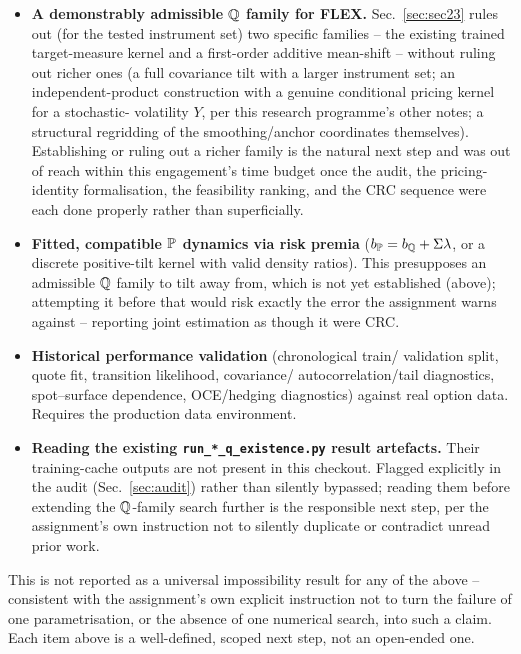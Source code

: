 \begin{itemize}[leftmargin=1.4em]
\item \textbf{A demonstrably admissible $\mathbb Q$ family for FLEX.}
  Sec.~\ref{sec:sec23} rules out (for the tested instrument set) two
  specific families -- the existing trained target-measure kernel and a
  first-order additive mean-shift -- without ruling out richer ones (a full
  covariance tilt with a larger instrument set; an independent-product
  construction with a genuine conditional pricing kernel for a stochastic-
  volatility $Y$, per this research programme's other notes; a structural
  regridding of the smoothing/anchor coordinates themselves). Establishing
  or ruling out a richer family is the natural next step and was out of
  reach within this engagement's time budget once the audit, the pricing-
  identity formalisation, the feasibility ranking, and the CRC sequence were
  each done properly rather than superficially.
\item \textbf{Fitted, compatible $\mathbb P$ dynamics via risk premia}
  ($b_\mathbb P=b_\mathbb Q+\Sigma\lambda$, or a discrete positive-tilt kernel with valid
  density ratios). This presupposes an admissible $\mathbb Q$ family to tilt away
  from, which is not yet established (above); attempting it before that
  would risk exactly the error the assignment warns against -- reporting
  joint estimation as though it were CRC.
\item \textbf{Historical performance validation} (chronological train/
  validation split, quote fit, transition likelihood, covariance/
  autocorrelation/tail diagnostics, spot--surface dependence, OCE/hedging
  diagnostics) against real option data. Requires the production data
  environment.
\item \textbf{Reading the existing \texttt{run\_*\_q\_existence.py} result
  artefacts.} Their training-cache outputs are not present in this checkout.
  Flagged explicitly in the audit (Sec.~\ref{sec:audit}) rather than silently
  bypassed; reading them before extending the $\mathbb Q$-family search further is
  the responsible next step, per the assignment's own instruction not to
  silently duplicate or contradict unread prior work.
\end{itemize}

This is not reported as a universal impossibility result for any of the above
-- consistent with the assignment's own explicit instruction not to turn the
failure of one parametrisation, or the absence of one numerical search, into
such a claim. Each item above is a well-defined, scoped next step, not an
open-ended one.
